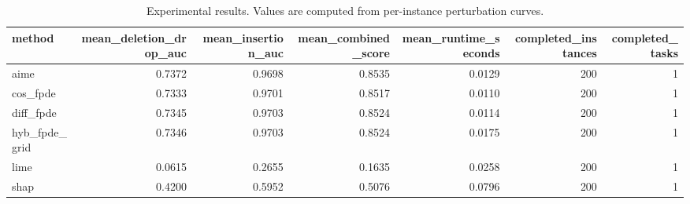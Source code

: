 \begin{table}[t]
\caption{Experimental results. Values are computed from per-instance perturbation curves.}
\label{tab:main_results_computed}
\centering
\begin{tabular}{lrrrrrr}
\toprule
method & mean\_deletion\_drop\_auc & mean\_insertion\_auc & mean\_combined\_score & mean\_runtime\_seconds & completed\_instances & completed\_tasks \\
\midrule
aime & 0.7372 & 0.9698 & 0.8535 & 0.0129 & 200 & 1 \\
cos\_fpde & 0.7333 & 0.9701 & 0.8517 & 0.0110 & 200 & 1 \\
diff\_fpde & 0.7345 & 0.9703 & 0.8524 & 0.0114 & 200 & 1 \\
hyb\_fpde\_grid & 0.7346 & 0.9703 & 0.8524 & 0.0175 & 200 & 1 \\
lime & 0.0615 & 0.2655 & 0.1635 & 0.0258 & 200 & 1 \\
shap & 0.4200 & 0.5952 & 0.5076 & 0.0796 & 200 & 1 \\
\bottomrule
\end{tabular}

\end{table}
